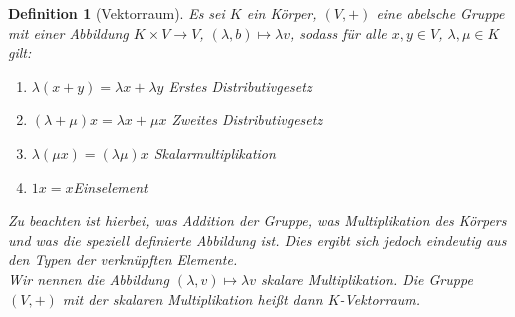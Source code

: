 \documentclass{report}
\newcommand{\IN}[1]{\index{#1|BH}}
\newcommand{\lb}{\lambda}
\theoremstyle{customrem}
\theoremstyle{customdef}
\newtheorem{definition}{Definition}[chapter]
\begin{document}
	\begin{definition}[Vektorraum]
		\IN{Vektorraum}
		\label{def21}
		Es sei $K$ ein Körper, $(V, +)$ eine abelsche Gruppe mit einer Abbildung $K \times V \to V$, $(\lb, b) \mapsto \lb v$, sodass für alle $x, y \in V$, $\lb, \mu \in K$ gilt:
		
		\begin{enumerate}[leftmargin=3cm, rightmargin=2cm]
			\itemsep0cm
			\item $\lb (x + y) = \lb x + \lb y$ \hfill Erstes Distributivgesetz
			\item $(\lb + \mu) x = \lb x + \mu x$ \hfill Zweites Distributivgesetz
			\item $\lb (\mu x) = (\lb \mu) x$	\hfill Skalarmultiplikation
			\item $1 x = x$\hfill Einselement
		\end{enumerate}
		
		\noindent
		Zu beachten ist hierbei, was Addition der Gruppe, was Multiplikation des Körpers und was die speziell definierte Abbildung ist. Dies ergibt sich jedoch eindeutig aus den Typen der verknüpften Elemente.\\
		Wir nennen die Abbildung $(\lb, v) \mapsto \lb v$ skalare Multiplikation. Die Gruppe $(V, +)$ mit der skalaren Multiplikation  heißt dann $K$-Vektorraum.
		

\end{definition}
\end{document}
